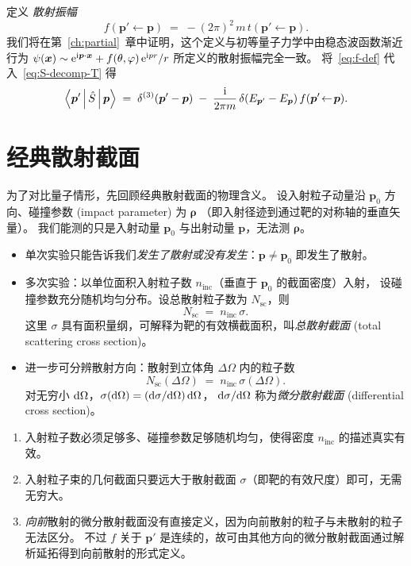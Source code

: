 定义 \emph{散射振幅}
\begin{equation}
\boxed{\;f(\bm{p}'\!\leftarrow\!\bm{p}) \;=\; -(2\pi)^2\,m\,t(\bm{p}'\!\leftarrow\!\bm{p}).\;}
\label{eq:f-def}
\end{equation}
我们将在第~\ref{ch:partial}~章中证明，这个定义与初等量子力学中由稳态波函数渐近行为
$\psi(\bm{x}) \sim \mathrm{e}^{\mathrm{i}\bm{p}\cdot\bm{x}} + f(\theta,\varphi)\,\mathrm{e}^{\mathrm{i} p r}/r$
所定义的散射振幅完全一致。
将~\eqref{eq:f-def} 代入~\eqref{eq:S-decomp-T} 得
\begin{equation}
\left\langle \bm{p}' \,\middle|\, \hat{S} \,\middle|\, \bm{p} \right\rangle \;=\; \delta^{(3)}(\bm{p}'-\bm{p})
\;-\; \frac{\mathrm{i}}{2\pi m}\,\delta(E_{\bm{p}'}-E_{\bm{p}})\,f(\bm{p}'\!\leftarrow\!\bm{p}).
\label{eq:S-decomp-f}
\end{equation}

\section{经典散射截面}

为了对比量子情形，先回顾经典散射截面的物理含义。
设入射粒子动量沿 $\bm{p}_0$ 方向、碰撞参数 (impact parameter) 为 $\bm{\rho}$
（即入射径迹到通过靶的对称轴的垂直矢量）。
我们能测的只是入射动量 $\bm{p}_0$ 与出射动量 $\bm{p}$，无法测 $\bm{\rho}$。

\begin{itemize}
\item 单次实验只能告诉我们\emph{发生了散射或没有发生}：$\bm{p}\neq\bm{p}_0$ 即发生了散射。
\item 多次实验：以单位面积入射粒子数 $n_{\text{inc}}$（垂直于 $\bm{p}_0$ 的截面密度）入射，
设碰撞参数充分随机均匀分布。设总散射粒子数为 $N_{\text{sc}}$，则
\begin{equation}
N_{\text{sc}} \;=\; n_{\text{inc}}\,\sigma.
\label{eq:Nsc-tot}
\end{equation}
这里 $\sigma$ 具有面积量纲，可解释为靶的有效横截面积，叫\emph{总散射截面} (total scattering cross section)。
\item 进一步可分辨散射方向：散射到立体角 $\Delta\Omega$ 内的粒子数
\begin{equation}
N_{\text{sc}}(\Delta\Omega) \;=\; n_{\text{inc}}\,\sigma(\Delta\Omega).
\end{equation}
对无穷小 $\mathrm{d}\Omega$，$\sigma(\mathrm{d}\Omega) = (\mathrm{d}\sigma/\mathrm{d}\Omega)\,\mathrm{d}\Omega$，
$\mathrm{d}\sigma/\mathrm{d}\Omega$ 称为\emph{微分散射截面} (differential cross section)。
\end{itemize}

\begin{remark}[使用条件]
\begin{enumerate}
\item 入射粒子数必须足够多、碰撞参数足够随机均匀，使得密度 $n_{\text{inc}}$ 的描述真实有效。
\item 入射粒子束的几何截面只要远大于散射截面 $\sigma$（即靶的有效尺度）即可，无需无穷大。
\item \emph{向前}散射的微分散射截面没有直接定义，因为向前散射的粒子与未散射的粒子无法区分。
不过 $f$ 关于 $\bm{p}'$ 是连续的，故可由其他方向的微分散射截面通过解析延拓得到向前散射的形式定义。
\end{enumerate}
\end{remark}

